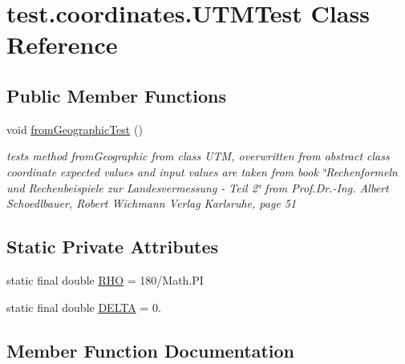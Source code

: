 \hypertarget{classtest_1_1coordinates_1_1_u_t_m_test}{}\section{test.\+coordinates.\+U\+T\+M\+Test Class Reference}
\label{classtest_1_1coordinates_1_1_u_t_m_test}
\subsection*{Public Member Functions}
\begin{DoxyCompactItemize}
\item 
void \hyperlink{classtest_1_1coordinates_1_1_u_t_m_test_a44280f63ebc9a9e457d82aba882bb55e}{from\+Geographic\+Test} ()
\begin{DoxyCompactList}\small\item\em tests method from\+Geographic from class U\+TM, overwritten from abstract class coordinate expected values and input values are taken from book \char`\"{}\+Rechenformeln und Rechenbeispiele zur Landesvermessung -\/ Teil 2\char`\"{} from Prof.\+Dr.-\/\+Ing. Albert Schoedlbauer, Robert Wichmann Verlag Karlsruhe, page 51 \end{DoxyCompactList}\end{DoxyCompactItemize}
\subsection*{Static Private Attributes}
\begin{DoxyCompactItemize}
\item 
static final double \hyperlink{classtest_1_1coordinates_1_1_u_t_m_test_af2bba3a46cbc36b4582eb2c835ff9398}{R\+HO} = 180/Math.\+PI
\item 
static final double \hyperlink{classtest_1_1coordinates_1_1_u_t_m_test_ab622b84892fbc78c561d318e27027b5f}{D\+E\+L\+TA} = 0.
\end{DoxyCompactItemize}


\subsection{Member Function Documentation}
\mbox{\label{classtest_1_1coordinates_1_1_u_t_m_test_a44280f63ebc9a9e457d82aba882bb55e}} 
